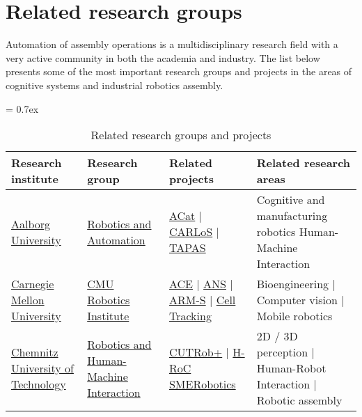 \section{Related research groups}

Automation of assembly operations is a multidisciplinary research field with a very active community in both the academia and industry. The list below presents some of the most important research groups and projects in the areas of cognitive systems and industrial robotics assembly.

\begin{table}[H]
	\caption{Related research groups and projects}
	\tabulinesep = 0.7ex
	\centering
	\scriptsize
	\begin{tabu} { X[m,c] X[0.9,m,c] X[1.2,m,c] X[1.8,m,c] }
		\rowfont{\bfseries\itshape} Research institute & Research group & Related projects & Related research areas \\
		\hline
		\href{http://www.en.aau.dk}{Aalborg University} &
		\href{http://robotics-automation.aau.dk}{Robotics and Automation} &
		\href{http://www.acat-project.eu/}{ACat} | \href{http://carlosproject.eu/}{CARLoS} | \href{http://tapas-project.eu/}{TAPAS} &
		Cognitive and manufacturing robotics Human-Machine Interaction \\


		\tabucline[1pt on 1.5pt off 3pt]{-}
		\href{http://www.cmu.edu}{Carnegie Mellon University} &
		\href{https://www.ri.cmu.edu}{CMU Robotics Institute} &
		\href{http://www.frc.ri.cmu.edu/projects/ace}{ACE} | \href{https://www.ri.cmu.edu/research_project_detail.html?project_id=550\&menu_id=261}{ANS} | \href{http://www.nrec.ri.cmu.edu/projects/arms}{ARM-S} | \href{https://www.ri.cmu.edu/research_project_detail.html?project_id=579\&menu_id=261}{Cell Tracking} &
		Bioengineering | Computer vision | Mobile robotics \\

		\tabucline[1pt on 1.5pt off 3pt]{-}
		\href{https://www.tu-chemnitz.de}{Chemnitz University of Technology} &
		\href{https://www.tu-chemnitz.de/etit/robosys/index.php.en}{Robotics and Human-Machine Interaction} &
		\href{http://www.euroc-project.eu/index.php?id=challenger_cutrob}{CUTRob+} | \href{http://www.drematrix.de/projects/hroc-human-robot-cooperation/}{H-RoC} \href{http://www.smerobotics.org/AUTOMATICA/exhibit-02-2016.html}{SMERobotics} &
		2D / 3D perception | Human-Robot Interaction | Robotic assembly \\


\end{tabu}
\end{table}
